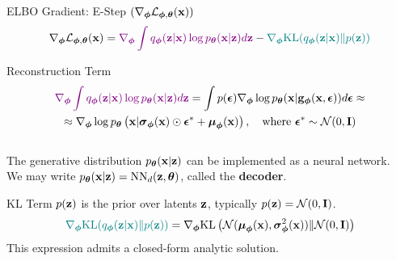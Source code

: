 \documentclass{beamer}
\begin{document}
\begin{frame}{ELBO Gradient: E-Step $(\nabla_{\bphi} \cL_{\bphi, \btheta}(\bx))$}
	\vspace{-0.3cm}
	\[
		\nabla_{\bphi} \cL_{\bphi, \btheta}(\bx) = {\color{violet}\nabla_{\bphi} \int q_{\bphi}(\bz| \bx)\log \pt(\bx | \bz) d \bz} - {\color{teal}\nabla_{\bphi} \KL(q_{\bphi}(\bz| \bx) \| p(\bz))}
	\]
	\eqpause
	\vspace{-0.3cm}
	\begin{block}{Reconstruction Term}
		\vspace{-0.7cm}
		\begin{multline*}
			 {\color{violet}\nabla_{\bphi} \int q_{\bphi}(\bz| \bx)\log \pt(\bx | \bz) d \bz} = \int p(\bepsilon) \nabla_{\bphi} \log \pt(\bx | \bg_{\bphi}(\bx, \bepsilon)) d\bepsilon \approx \\
			 \approx \nabla_{\bphi} \log \pt\left(\bx | \bsigma_{\bphi}(\bx) \odot \bepsilon^* + \bmu_{\bphi}(\bx)\right), \quad \text{where } \bepsilon^* \sim \cN(0, \bI)
		\end{multline*}
		\eqpause
		\vspace{-0.5cm} \\
		The generative distribution $\pt(\bx | \bz)$ can be implemented as a neural network. \\
		We may write $\pt(\bx | \bz) = \text{NN}_d(\bz, \btheta)$, called the \textbf{decoder}.
	\end{block}
	\begin{block}{KL Term}
		$p(\bz)$ is the prior over latents $\bz$, typically $p(\bz) = \cN (0, \bI)$.
		\[
			{\color{teal}\nabla_{\bphi} \KL(q_{\bphi}(\bz| \bx) \| p(\bz))} = \nabla_{\bphi} \KL\left( \cN (\bmu_{\bphi}(\bx), \bsigma^2_{\bphi}(\bx)) \| \cN (0, \bI) \right)
		\]
		\eqpause
		This expression admits a closed-form analytic solution.
	\end{block}
\end{frame}
\end{document}

